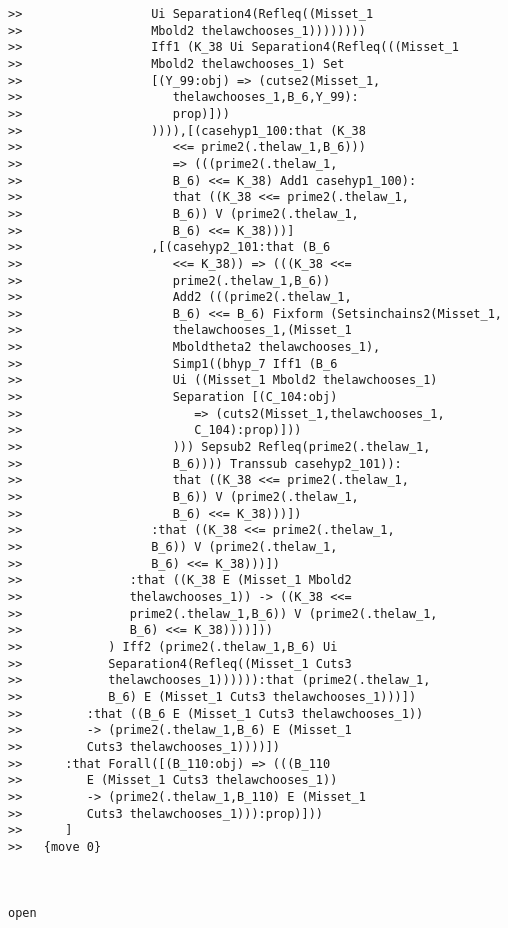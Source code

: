 \documentclass[12pt]{article}
\begin{document}
\begin{verbatim}
>>                  Ui Separation4(Refleq((Misset_1
>>                  Mbold2 thelawchooses_1))))))))
>>                  Iff1 (K_38 Ui Separation4(Refleq(((Misset_1
>>                  Mbold2 thelawchooses_1) Set
>>                  [(Y_99:obj) => (cutse2(Misset_1,
>>                     thelawchooses_1,B_6,Y_99):
>>                     prop)]))
>>                  )))),[(casehyp1_100:that (K_38
>>                     <<= prime2(.thelaw_1,B_6)))
>>                     => (((prime2(.thelaw_1,
>>                     B_6) <<= K_38) Add1 casehyp1_100):
>>                     that ((K_38 <<= prime2(.thelaw_1,
>>                     B_6)) V (prime2(.thelaw_1,
>>                     B_6) <<= K_38)))]
>>                  ,[(casehyp2_101:that (B_6
>>                     <<= K_38)) => (((K_38 <<=
>>                     prime2(.thelaw_1,B_6))
>>                     Add2 (((prime2(.thelaw_1,
>>                     B_6) <<= B_6) Fixform (Setsinchains2(Misset_1,
>>                     thelawchooses_1,(Misset_1
>>                     Mboldtheta2 thelawchooses_1),
>>                     Simp1((bhyp_7 Iff1 (B_6
>>                     Ui ((Misset_1 Mbold2 thelawchooses_1)
>>                     Separation [(C_104:obj)
>>                        => (cuts2(Misset_1,thelawchooses_1,
>>                        C_104):prop)]))
>>                     ))) Sepsub2 Refleq(prime2(.thelaw_1,
>>                     B_6)))) Transsub casehyp2_101)):
>>                     that ((K_38 <<= prime2(.thelaw_1,
>>                     B_6)) V (prime2(.thelaw_1,
>>                     B_6) <<= K_38)))])
>>                  :that ((K_38 <<= prime2(.thelaw_1,
>>                  B_6)) V (prime2(.thelaw_1,
>>                  B_6) <<= K_38)))])
>>               :that ((K_38 E (Misset_1 Mbold2
>>               thelawchooses_1)) -> ((K_38 <<=
>>               prime2(.thelaw_1,B_6)) V (prime2(.thelaw_1,
>>               B_6) <<= K_38))))]))
>>            ) Iff2 (prime2(.thelaw_1,B_6) Ui
>>            Separation4(Refleq((Misset_1 Cuts3
>>            thelawchooses_1)))))):that (prime2(.thelaw_1,
>>            B_6) E (Misset_1 Cuts3 thelawchooses_1)))])
>>         :that ((B_6 E (Misset_1 Cuts3 thelawchooses_1))
>>         -> (prime2(.thelaw_1,B_6) E (Misset_1
>>         Cuts3 thelawchooses_1))))])
>>      :that Forall([(B_110:obj) => (((B_110
>>         E (Misset_1 Cuts3 thelawchooses_1))
>>         -> (prime2(.thelaw_1,B_110) E (Misset_1
>>         Cuts3 thelawchooses_1))):prop)]))
>>      ]
>>   {move 0}



open


\end{verbatim}
\end{document}
